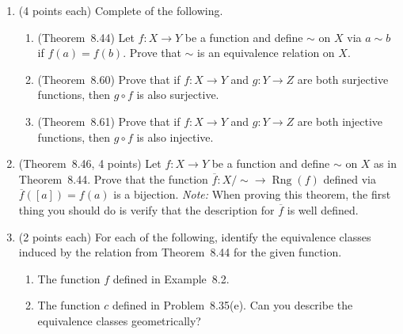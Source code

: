 \documentclass[11pt]{article}
\theoremstyle{definition}
\DeclareMathOperator{\range}{Rng}
\begin{document}
\begin{enumerate}

\item (4 points each) Complete  of the following.
\begin{enumerate}

\item (Theorem~8.44) Let $f:X\to Y$ be a function and define $\sim$ on $X$ via $a\sim b$ if $f(a) = f(b)$. Prove that $\sim$ is an equivalence relation on $X$.
\item (Theorem~8.60) Prove that if $f:X\to Y$ and $g:Y\to Z$ are both surjective functions, then $g\circ f$ is also surjective.
\item (Theorem~8.61) Prove that if $f:X\to Y$ and $g:Y\to Z$ are both injective functions, then $g\circ f$ is also injective.
\end{enumerate}

\item (Theorem~8.46, 4 points) Let $f:X\to Y$ be a function and define $\sim$ on $X$ as in Theorem~8.44. Prove that the function $\overline{f}:X/{\sim}\to \range(f)$ defined via $\overline{f}([a]) = f(a)$ is a bijection. \emph{Note:} When proving this theorem, the first thing you should do is verify that the description for $\overline{f}$ is well defined.

\item (2 points each) For each of the following, identify the equivalence classes induced by the relation from Theorem~8.44 for the given function.
\begin{enumerate}[label=\textrm{(\alph*)}]
\item The function $f$ defined in Example~8.2.
\item The function $c$ defined in Problem~8.35(e). Can you describe the equivalence classes geometrically?
\end{enumerate}

\end{enumerate}
\end{document}
